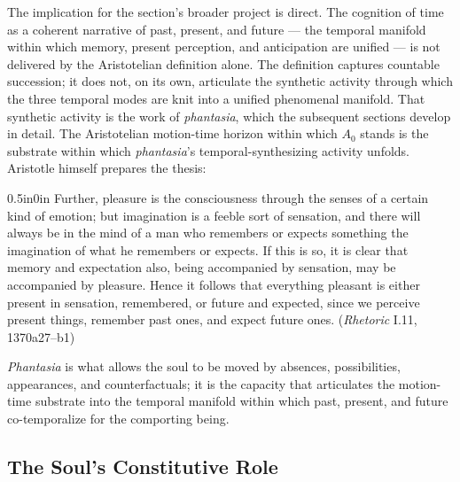 \documentclass{article}
\begin{document}
The implication for the section's broader project is direct. The cognition of time as a coherent narrative of past, present, and future --- the temporal manifold within which memory, present perception, and anticipation are unified --- is not delivered by the Aristotelian definition alone. The definition captures countable succession; it does not, on its own, articulate the synthetic activity through which the three temporal modes are knit into a unified phenomenal manifold. That synthetic activity is the work of \textit{phantasia}, which the subsequent sections develop in detail. The Aristotelian motion-time horizon within which $A_0$ stands is the substrate within which \textit{phantasia}'s temporal-synthesizing activity unfolds. Aristotle himself prepares the thesis:
\begin{adjustwidth}{0.5in}{0in}
Further, pleasure is the consciousness through the senses of a certain kind of emotion; but imagination is a feeble sort of sensation, and there will always be in the mind of a man who remembers or expects something the imagination of what he remembers or expects. If this is so, it is clear that memory and expectation also, being accompanied by sensation, may be accompanied by pleasure. Hence it follows that everything pleasant is either present in sensation, remembered, or future and expected, since we perceive present things, remember past ones, and expect future ones. (\textit{Rhetoric} I.11, 1370a27--b1)
\end{adjustwidth}
\textit{Phantasia} is what allows the soul to be moved by absences, possibilities, appearances, and counterfactuals; it is the capacity that articulates the motion-time substrate into the temporal manifold within which past, present, and future co-temporalize for the comporting being.

\subsection{The Soul's Constitutive Role}
\end{document}
